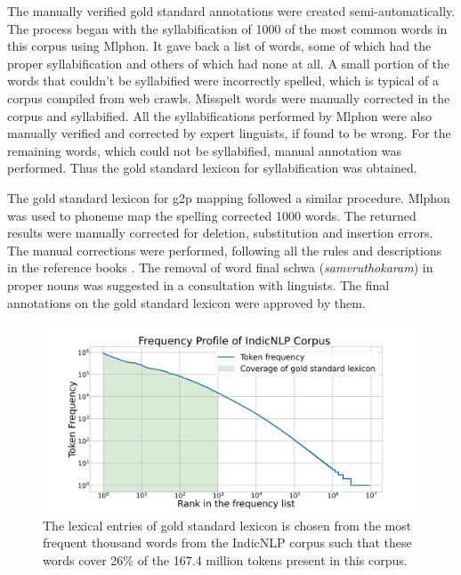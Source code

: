 \documentclass{ieeeaccess}
\begin{document}
The manually verified gold standard annotations were created semi-automatically. The process began with the syllabification of 1000 of the most common words in this corpus using Mlphon. It gave back a list of words, some of which had the proper syllabification and others of which had none at all. A small portion of the words that couldn't be syllabified were incorrectly spelled, which is typical of a corpus compiled from web crawls. Misspelt words were manually corrected in the corpus and syllabified. All the syllabifications performed by Mlphon were also manually verified and corrected by expert linguists, if found to be wrong. For the remaining words, which could not be syllabified, manual annotation was performed. Thus the gold standard lexicon for syllabification was obtained.

The gold standard lexicon for g2p mapping followed a similar procedure. Mlphon was used to phoneme map the spelling corrected 1000 words. The returned results were manually corrected for deletion, substitution and insertion errors. The manual corrections were performed, following all the rules and descriptions in the reference books \cite{asher1997,prabo2016}. The removal of word final schwa (\textit{samvruthokaram}) in proper nouns was suggested in a consultation with linguists. The final annotations on the gold standard lexicon were approved by them.

\begin{figure}[h]
    \centering
    \includegraphics[width=\linewidth]{rank.png}
    \caption{The lexical entries of gold standard lexicon is chosen from the most frequent thousand words from the IndicNLP corpus \cite{kunchukuttan2020ai4bharat} such that these words cover 26\% of the 167.4 million tokens present in this corpus.}
    \label{rank}
\end{figure}
\end{document}
